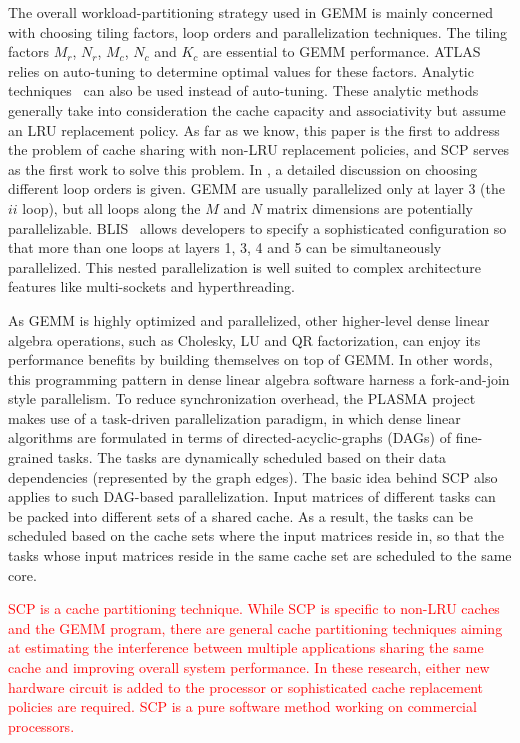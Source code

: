 The overall workload-partitioning strategy used in
GEMM is mainly concerned with choosing 
tiling factors, loop orders and parallelization
techniques.
The tiling factors $M_r$, $N_r$, $M_c$, $N_c$ and $K_c$
are essential to GEMM performance.
ATLAS~\cite{atlas} relies on auto-tuning to determine optimal
values for these factors.
Analytic techniques~\cite{analytic1,analytic2,blisanalytic} 
can also be used instead of auto-tuning.
These analytic methods generally take into consideration
the cache capacity and associativity
but assume an LRU replacement policy.
As far as we know, this paper is the first to
address the problem of cache sharing with non-LRU replacement policies,
and SCP serves as the first work to solve this problem.
In \cite{gotogemm}, a detailed discussion on
choosing different loop orders is given.
GEMM are usually parallelized only at layer 3 (the $ii$ loop),
but all loops along the $M$ and $N$ matrix dimensions
are potentially parallelizable.
BLIS~\cite{blispar} allows developers to specify a sophisticated configuration
so that more than one loops at layers 1, 3, 4 and 5
can be simultaneously parallelized.
This nested parallelization is well suited to complex architecture features
like multi-sockets and hyperthreading. 

As GEMM is highly optimized and parallelized,
other higher-level dense linear algebra operations,
such as Cholesky, LU and QR factorization, can
enjoy its performance benefits by building themselves
on top of GEMM.
In other words, this programming pattern in dense linear algebra software
harness a fork-and-join style parallelism.
To reduce synchronization overhead,
the PLASMA project~\cite{plasma2009,plasma2010,plasma2017}
makes use of a task-driven parallelization paradigm,
in which dense linear algorithms are formulated in
terms of 
directed-acyclic-graphs (DAGs) of fine-grained tasks.
The tasks are dynamically scheduled based on their
data dependencies (represented by the graph edges).
The basic idea behind SCP also applies to such
DAG-based parallelization.
Input matrices of different tasks can be packed into
different sets of a shared cache. As a result, 
the tasks can be scheduled based on the cache sets 
where the input matrices reside in, so that
the tasks whose input matrices reside 
in the same cache set
are scheduled to the same core.

\textcolor{red}{
SCP is a cache partitioning technique.
While SCP is specific to non-LRU caches and the GEMM program,
there are general cache partitioning techniques \cite{cp0, cp1, cp2}
aiming at estimating the interference between multiple applications
sharing the same cache and improving overall system performance.
In these research, either new hardware circuit is added to the processor
or sophisticated cache replacement policies are required.
SCP is a pure software method working on commercial processors.
}
